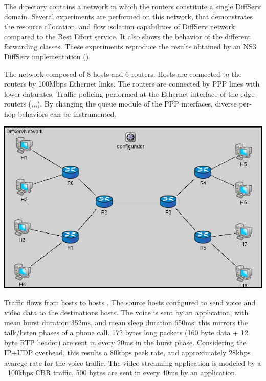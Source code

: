 The  directory contains
a network in which the routers constitute a single DiffServ domain.
Several experiments are performed on this network, that demonstrates
the resource allocation, and flow isolation capabilities of DiffServ
network compared to the Best Effort service. It also shows the
behavior of the different forwarding classes. These experiments
reproduce the results obtained by an NS3 DiffServ implementation
(\cite{Sanjay2010}).

The network composed of 8 hosts and 6 routers.
Hosts are connected to the routers by 100Mbps Ethernet links. The
routers are connected by PPP lines with lower datarates.
Traffic policing performed at the Ethernet interface of the edge
routers (,,,). By changing
the queue module of the PPP interfaces, diverse per-hop behaviors
can be instrumented.

\begin{center}
\includegraphics[scale=0.5]{figures/OneDomainDiffservNetwork.png}
\end{center}

Traffic flows from hosts  to hosts . The source hosts
configured to send voice and video data to the destinations hosts. The voice
is sent by an  application, with mean burst duration
352ms, and mean sleep duration 650ms; this mirrors the talk/listen phases
of a phone call. 172 bytes long packets (160 byte data + 12 byte RTP header)
are sent in every 20ms in the burst phase. Considering the IP+UDP overhead,
this results a 80kbps peek rate, and approximately 28kbps avarege rate for
the voice traffic. The video streaming application is modeled by a ~100kbps
CBR traffic, 500 bytes are sent in every 40ms by an 
application.

